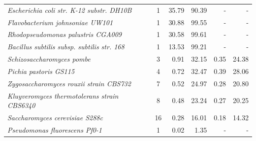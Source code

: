 \begin{table}[ht!]
\begin{center}
\begin{tabular}{l | c | r | r | r | r}
\footnotesize{\textit{Escherichia coli str. K-12 substr. DH10B}} & \footnotesize{1} & 35.79 & 90.39 & - & - \\
\footnotesize{\textit{Flavobacterium johnsoniae UW101}} & \footnotesize{1} & 30.88 & 99.55 & - & - \\
\footnotesize{\textit{Rhodopseudomonas palustris CGA009}} & \footnotesize{1} & 30.58 & 99.61 & - & - \\
\footnotesize{\textit{Bacillus subtilis subsp. subtilis str. 168}} & \footnotesize{1} & 13.53 & 99.21 & - & - \\
\footnotesize{\textit{Schizosaccharomyces pombe}} & \footnotesize{3} & 0.91 & 32.15 & 0.35 & 24.38 \\
\footnotesize{\textit{Pichia pastoris GS115}} & \footnotesize{4} & 0.72 & 32.47 & 0.39 & 28.06 \\
\footnotesize{\textit{Zygosaccharomyces rouxii strain CBS732}} & \footnotesize{7} & 0.52 & 24.97 & 0.28 & 20.80 \\
\footnotesize{\textit{Kluyveromyces thermotolerans strain CBS6340}} & \footnotesize{8} & 0.48 & 23.24 & 0.27 & 20.25 \\
\footnotesize{\textit{Saccharomyces cerevisiae S288c}} & \footnotesize{16} & 0.28 & 16.01 & 0.18 & 14.32 \\
\footnotesize{\textit{Pseudomonas fluorescens Pf0-1}} & \footnotesize{1} & 0.02 & 1.35 & - & - \\
\end{tabular}
\end{center}
\label{supptable:m2_qc}
\end{table}

